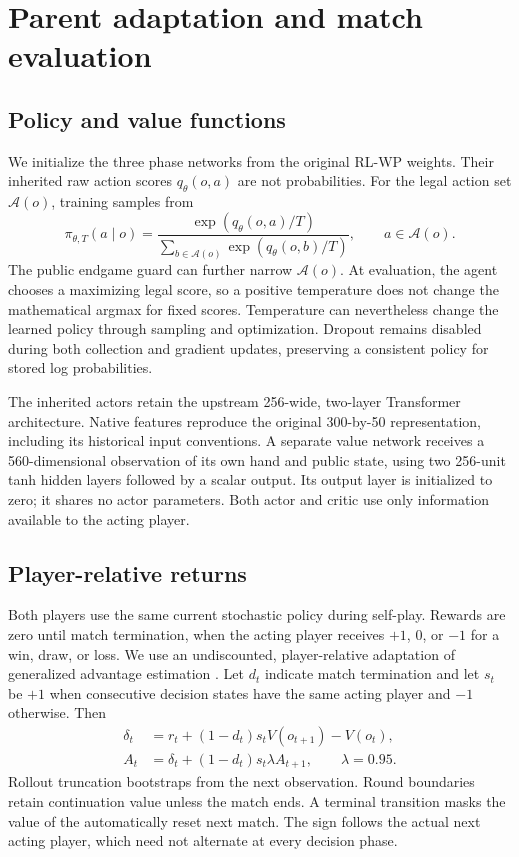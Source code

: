 \section{Parent adaptation and match evaluation}\label{app:parent-adaptation}
\subsection{Policy and value functions}
We initialize the three phase networks from the original RL-WP weights.
Their inherited raw action scores $q_\theta(o,a)$ are not probabilities.
For the legal action set $\mathcal A(o)$, training samples from
\begin{equation}
 \pi_{\theta,T}(a\mid o)=
 \frac{\exp(q_\theta(o,a)/T)}
 {\sum_{b\in\mathcal A(o)}\exp(q_\theta(o,b)/T)},\qquad a\in\mathcal A(o).
\end{equation}
The public endgame guard can further narrow $\mathcal A(o)$. At evaluation,
the agent chooses a maximizing legal score, so a positive temperature does not
change the mathematical argmax for fixed scores. Temperature can nevertheless
change the learned policy through sampling and optimization. Dropout remains
disabled during both collection and gradient updates, preserving a consistent
policy for stored log probabilities.

The inherited actors retain the upstream 256-wide, two-layer Transformer
architecture. Native features reproduce the original 300-by-50 representation,
including its historical input conventions. A separate value network receives
a 560-dimensional observation of its own hand and public state, using two
256-unit tanh hidden
layers followed by a scalar output. Its output layer is initialized to zero;
it shares no actor parameters. Both actor and critic use only information available to the acting player.

\subsection{Player-relative returns}
Both players use the same current stochastic policy during self-play. Rewards
are zero until match termination, when the acting player receives $+1$, $0$,
or $-1$ for a win, draw, or loss. We use an undiscounted, player-relative
adaptation of generalized advantage estimation \cite{schulman2015gae}.
Let $d_t$ indicate match termination and let $s_t$ be $+1$ when consecutive
decision states have the same acting player and $-1$ otherwise. Then
\begin{align}
 \delta_t &= r_t+(1-d_t)s_t V(o_{t+1})-V(o_t),\\
 A_t &= \delta_t+(1-d_t)s_t\lambda A_{t+1},\qquad \lambda=0.95.
\end{align}
Rollout truncation bootstraps from the next observation. Round boundaries
retain continuation value unless the match ends. A terminal transition masks
the value of the automatically reset next match. The sign follows the actual
next acting player, which need not alternate at every decision phase.

